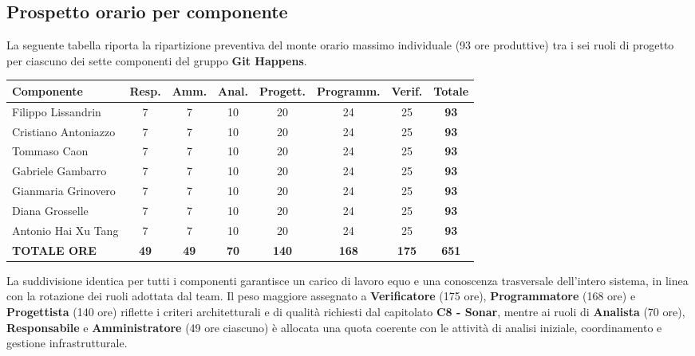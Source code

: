 \newpage
\subsection{Prospetto orario per componente}
La seguente tabella riporta la ripartizione preventiva del monte orario massimo individuale (93 ore produttive) tra i sei ruoli di progetto per ciascuno dei sette componenti del gruppo \textbf{Git Happens}.

\vspace{2mm}
\renewcommand{\arraystretch}{1.3}
\noindent
{\setlength{\tabcolsep}{4.5pt}%
\begin{tabularx}{\textwidth}{|>{\raggedright\arraybackslash}X c c c c c c | c|}
\hline
\textbf{Componente} & \textbf{Resp.} & \textbf{Amm.} & \textbf{Anal.} & \textbf{Progett.} & \textbf{Programm.} & \textbf{Verif.} & \textbf{Totale} \\
\hline
Filippo Lissandrin & 7 & 7 & 10 & 20 & 24 & 25 & \textbf{93} \\
Cristiano Antoniazzo & 7 & 7 & 10 & 20 & 24 & 25 & \textbf{93} \\
Tommaso Caon & 7 & 7 & 10 & 20 & 24 & 25 & \textbf{93} \\
Gabriele Gambarro & 7 & 7 & 10 & 20 & 24 & 25 & \textbf{93} \\
Gianmaria Grinovero & 7 & 7 & 10 & 20 & 24 & 25 & \textbf{93} \\
Diana Grosselle & 7 & 7 & 10 & 20 & 24 & 25 & \textbf{93} \\
Antonio Hai Xu Tang & 7 & 7 & 10 & 20 & 24 & 25 & \textbf{93} \\
\hline
\textbf{TOTALE ORE} & \textbf{49} & \textbf{49} & \textbf{70} & \textbf{140} & \textbf{168} & \textbf{175} & \textbf{651} \\
\hline
\end{tabularx}}

\vspace{3mm}
\noindent
La suddivisione identica per tutti i componenti garantisce un carico di lavoro equo e una conoscenza trasversale dell'intero sistema, in linea con la rotazione dei ruoli adottata dal team. Il peso maggiore assegnato a \textbf{Verificatore} (175 ore), \textbf{Programmatore} (168 ore) e \textbf{Progettista} (140 ore) riflette i criteri architetturali e di qualità richiesti dal capitolato \textbf{C8 - Sonar}, mentre ai ruoli di \textbf{Analista} (70 ore), \textbf{Responsabile} e \textbf{Amministratore} (49 ore ciascuno) è allocata una quota coerente con le attività di analisi iniziale, coordinamento e gestione infrastrutturale.

